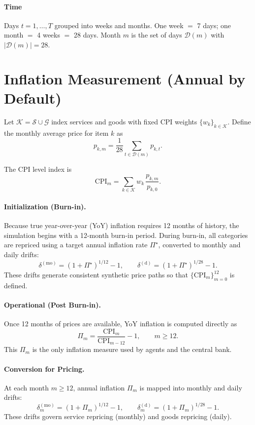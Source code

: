 \documentclass[12pt]{article}
\begin{document}
\paragraph{Time}
Days $t=1,\dots,T$ grouped into weeks and months. One week $=$ 7 days; one month $=$ 4 weeks $=$ 28 days. Month $m$ is the set of days $\mathcal{D}(m)$ with $\lvert \mathcal{D}(m)\rvert=28$.

\section{Inflation Measurement (Annual by Default)}

Let $\mathcal{K}=\mathcal{S}\cup\mathcal{G}$ index services and goods with fixed CPI weights $\{w_k\}_{k\in\mathcal{K}}$. Define the monthly average price for item $k$ as
$$
p_{k,m}=\frac{1}{28}\sum_{t\in\mathcal{D}(m)} p_{k,t}.
$$

The CPI level index is
$$
\mathrm{CPI}_m=\sum_{k\in\mathcal{K}}w_k\,\frac{p_{k,m}}{p_{k,0}}.
$$

\paragraph{Initialization (Burn-in).}  
Because true year-over-year (YoY) inflation requires 12 months of history, the simulation begins with a 12-month burn-in period. During burn-in, all categories are repriced using a target annual inflation rate $\Pi^\star$, converted to monthly and daily drifts:
$$
\delta^{(\mathrm{mo})}=(1+\Pi^\star)^{1/12}-1,\qquad
\delta^{(\mathrm{d})}=(1+\Pi^\star)^{1/28}-1.
$$
These drifts generate consistent synthetic price paths so that $\{\mathrm{CPI}_m\}_{m=0}^{12}$ is defined.

\paragraph{Operational (Post Burn-in).}  
Once 12 months of prices are available, YoY inflation is computed directly as
$$
\Pi_m=\frac{\mathrm{CPI}_m}{\mathrm{CPI}_{m-12}}-1,\qquad m \geq 12.
$$
This $\Pi_m$ is the only inflation measure used by agents and the central bank.

\paragraph{Conversion for Pricing.}  
At each month $m \geq 12$, annual inflation $\Pi_m$ is mapped into monthly and daily drifts:
$$
\delta_m^{(\mathrm{mo})}=(1+\Pi_m)^{1/12}-1,\qquad
\delta_m^{(\mathrm{d})}=(1+\Pi_m)^{1/28}-1.
$$
These drifts govern service repricing (monthly) and goods repricing (daily).
\end{document}
